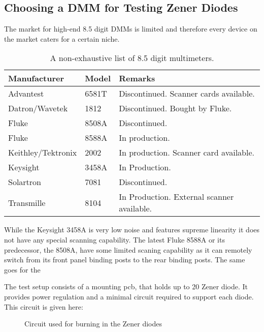 \subsection{Choosing a DMM for Testing Zener Diodes}
The market for high-end \num{8.5} digit DMMs is limited and therefore every device on the market caters for a certain niche.

\begin{table}[h]
    \centering
    \begin{tabular}{ |l|l|l| }
        \hline
        Manufacturer & Model & Remarks \\
        \hline
        Advantest & 6581T & Discontinued. Scanner cards available. \\
        Datron/Wavetek & 1812 & Discontinued. Bought by Fluke. \\
        Fluke & 8508A & Discontinued. \\
        Fluke & 8588A & In production. \\
        Keithley/Tektronix & 2002 & In production. Scanner card available. \\
        Keysight & 3458A & In Production. \\
        Solartron & 7081 & Discontinued. \\
        Transmille & 8104 & In Production. External scanner available. \\
        \hline
    \end{tabular}
    \caption{A non-exhaustive list of \num{8.5} digit multimeters.}
    \label{tab:list_of_dmms}
\end{table}


While the Keysight 3458A is very low noise and features supreme linearity it does not have any special scanning capability. The latest Fluke 8588A or its predecessor, the 8508A, have some limited scaning capability as it can remotely switch from its front panel binding posts to the rear binding posts. The same goes for the



The test setup consists of a mounting pcb, that holds up to 20 Zener diode. It provides power regulation and a minimal circuit required to support each diode. This circuit is given here:

\begin{figure}[ht]
    \centering
    \caption{Circuit used for burning in the Zener diodes}
\end{figure}

